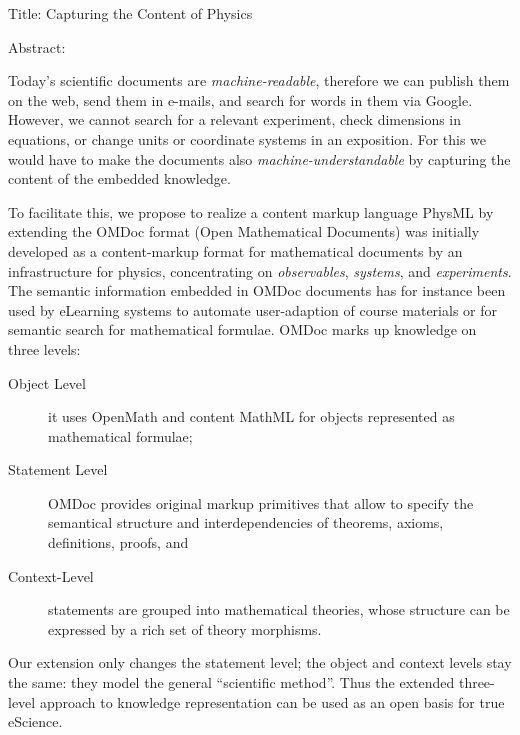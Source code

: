 Title: Capturing the Content of Physics

Abstract:

Today's scientific documents are {\emph{machine-readable}}, therefore we can publish them
on the web, send them in e-mails, and search for words in them via Google. However, we
cannot search for a relevant experiment, check dimensions in equations, or change units or
coordinate systems in an exposition. For this we would have to make the documents also
{\emph{machine-understandable}} by capturing the content of the embedded knowledge.

To facilitate this, we propose to realize a content markup language PhysML by extending
the OMDoc format (Open Mathematical Documents) was initially developed as a content-markup
format for mathematical documents by an infrastructure for physics, concentrating on
{\emph{observables}}, {\emph{systems}}, and {\emph{experiments}}. The semantic information
embedded in OMDoc documents has for instance been used by eLearning systems to automate
user-adaption of course materials or for semantic search for mathematical formulae. OMDoc
marks up knowledge on three levels:
\begin{description}
\item[Object Level] it uses OpenMath and content MathML for objects represented as
  mathematical formulae;
\item[Statement Level] OMDoc provides original markup primitives that allow to specify the
  semantical structure and interdependencies of theorems, axioms, definitions, proofs, and
\item[Context-Level] statements are grouped into mathematical theories, whose structure
  can be expressed by a rich set of theory morphisms.
\end{description}
Our extension only changes the statement level; the object and context levels stay the
same: they model the general ``scientific method''. Thus the extended three-level approach
to knowledge representation can be used as an open basis for true eScience.

